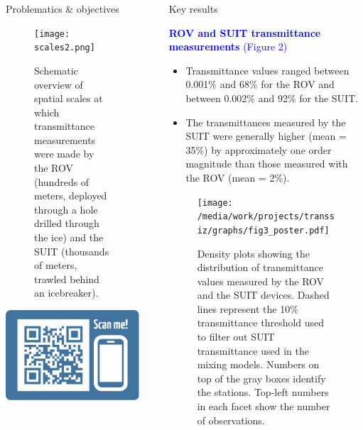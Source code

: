 \documentclass[final]{beamer}
\newlength{\sepwidth}
\newlength{\colwidth}
\newcommand{\separatorcolumn}{\begin{column}{\sepwidth}\end{column}}
\begin{document}
\begin{frame}[t]
\begin{columns}[t]
\begin{column}{\colwidth}
\begin{block}{Problematics \& objectives}
				\begin{figure}
					\centering
					\texttt{[image: scales2.png]}
					\caption{Schematic overview of spatial scales at which transmittance measurements were made by the ROV (hundreds of meters, deployed through a hole drilled through the ice) and the SUIT (thousands of meters, trawled behind an icebreaker).}
				\end{figure}

			\end{block}

			\vspace{-2.0cm}

			\includegraphics[scale = 3]{qr_poster_transsiz.pdf}

		\end{column}

		\separatorcolumn

		\begin{column}{\colwidth}

			\begin{block}{Key results}

				\textcolor{blue}{\large \textbf{ROV and SUIT transmittance measurements} (Figure 2)}

				\begin{itemize}
					\justifying
					\setlength\itemsep{1.5em}
					\item Transmittance values ranged between 0.001\% and 68\% for the ROV and between 0.002\% and 92\% for the SUIT.
					\item The transmittances measured by the SUIT were generally higher (mean = 35\%) by approximately one order magnitude than those measured with the ROV (mean = 2\%).
				\end{itemize}

				\begin{figure}
					\centering
					\texttt{[image: /media/work/projects/transsiz/graphs/fig3\_poster.pdf]}
					\caption{Density plots showing the distribution of transmittance values measured by the ROV and the SUIT devices. Dashed lines represent the 10\% transmittance threshold used to filter out SUIT transmittance used in the mixing models. Numbers on top of the gray boxes identify the stations. Top-left numbers in each facet show the number of observations.}
				\end{figure}


\end{block}
\end{column}
\end{columns}
\end{frame}
\end{document}
